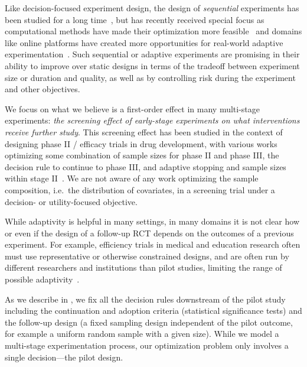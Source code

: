 Like decision-focused experiment design, the design of \emph{sequential} experiments has been studied for a long time~\cite{Wald47}, but has recently received special focus as computational methods have made their optimization more feasible~\cite{CheNa23,ChapelleLi11,TrellaZh22} and domains like online platforms have created more opportunities for real-world adaptive experimentation~\cite{AzevedoDe20,XuDu18}.
Such sequential or adaptive experiments are promising in their ability to improve over static designs in terms of the tradeoff between experiment size or duration and quality, as well as by controlling risk during the experiment and other objectives.

We focus on what we believe is a first-order effect in many multi-stage experiments: \emph{the screening effect of early-stage experiments on what interventions receive further study}.
This screening effect has been studied in the context of designing phase II / efficacy trials in drug development, with various works optimizing some combination of sample sizes for phase II and phase III, the decision rule to continue to phase III, and adaptive stopping and sample sizes within stage II~\cite{RossellMu07,DingRo08,KirchnerKi16,ErdmannKi20}.
We are not aware of any work optimizing the sample composition, i.e.\ the distribution of covariates, in a screening trial under a decision- or utility-focused objective.

While adaptivity is helpful in many settings, in many domains it is not clear how or even if the design of a follow-up RCT depends on the outcomes of a previous experiment.
For example, efficiency trials in medical and education research often must use representative or otherwise constrained designs, and are often run by different researchers and institutions than pilot studies, limiting the range of possible adaptivity~\cite{FDA19,DepartmentofEducationBo22}.

As we describe in , we fix all the decision rules downstream of the pilot study including the continuation and adoption criteria (statistical significance tests) and the follow-up design (a fixed sampling design independent of the pilot outcome, for example a uniform random sample with a given size).
While we model a multi-stage experimentation process, our optimization problem only involves a single decision---the pilot design.
